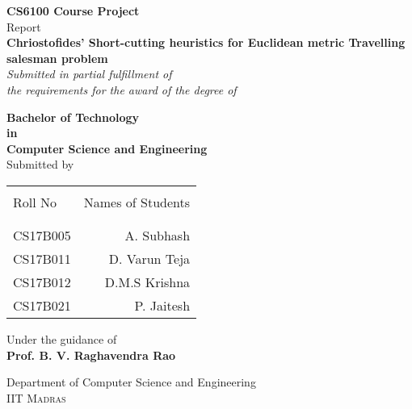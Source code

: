 \begin{titlepage}

       \begin{center}
       
       \textup{\small {\bf CS6100 Course Project} \\ Report}\\[0.2in]
       
       \Large \textbf {Chriostofides' Short-cutting heuristics for Euclidean metric Travelling salesman problem}\\[0.5in]
       
              \small \emph{Submitted in partial fulfillment of\\
               the requirements for the award of the degree of}
               \vspace{.2in}
       
              {\bf Bachelor of Technology \\in\\ Computer Science and Engineering}\\[0.5in]
       
       \normalsize Submitted by \\
       \begin{table}[h]
       \centering
       \begin{tabular}{lr}\hline \\
       Roll No & Names of Students \\ \\ \hline
       \\
       CS17B005 & A. Subhash \\
       CS17B011 &  D. Varun Teja\\
       CS17B012 &  D.M.S Krishna\\
       CS17B021 &  P. Jaitesh\\\hline 
       \end{tabular}
       \end{table}
       
       \vspace{.1in}
       Under the guidance of\\
       {\textbf{Prof. B. V. Raghavendra Rao}}\\[0.2in]
       
       \vfill
       
       \Large{Department of Computer Science and Engineering}\\
       \normalsize
       \textsc{IIT Madras}\\
       
       \end{center}
       
       \end{titlepage}
       